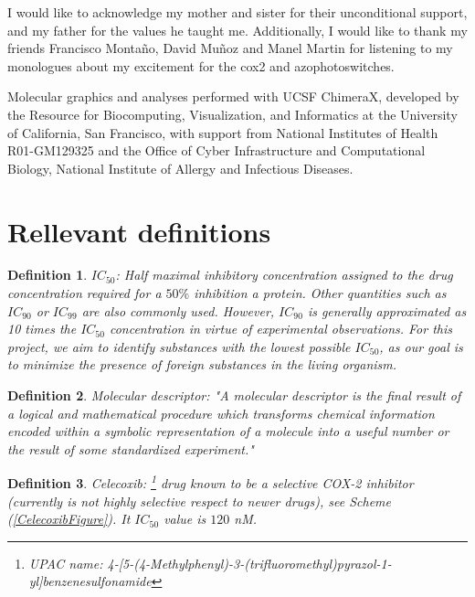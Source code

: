\documentclass[11pt]{article}
\newtheorem{definition}{Definition}
\begin{document}
I would like to acknowledge my mother and sister for their unconditional support, and my father for the values he taught me. Additionally, I would like to thank my friends Francisco Montaño, David Muñoz and Manel Martin for listening to my monologues about my excitement for the \gls{cox2} and azophotoswitches.

Molecular graphics and analyses performed with UCSF ChimeraX, developed by the Resource for Biocomputing, Visualization, and Informatics at the University of California, San Francisco, with support from National Institutes of Health R01-GM129325 and the Office of Cyber Infrastructure and Computational Biology, National Institute of Allergy and Infectious Diseases.

\newpage
\appendix
\section{Rellevant definitions}
\begin{definition}\label{definitionIC50}
$IC_{50}$: Half maximal inhibitory concentration assigned to the drug concentration required for a $50\%$ inhibition a protein. Other quantities such as $IC_{90}$ or $IC_{99}$ are also commonly used. However, $IC_{90}$ is generally approximated as 10 times the $IC_{50}$ concentration in virtue of experimental observations\cite{BookIC50}. For this project, we aim to identify substances with the lowest possible $IC_{50}$, as our goal is to minimize the presence of foreign substances in the living organism.
\end{definition}

\begin{definition}\label{definitionChemicalDescriptors}
Molecular descriptor: "A molecular descriptor is the final result of a logical and mathematical procedure which transforms chemical information encoded within a symbolic representation of a molecule into a useful number or the result of some standardized experiment."\cite{DescriptorsBook}
\end{definition}

\begin{definition}\label{definitionCelecoxib}
Celecoxib: \footnote{UPAC name: 4-[5-(4-Methylphenyl)-3-(trifluoromethyl)pyrazol-1-yl]benzenesulfonamide} drug known to be a selective COX-2 inhibitor (currently is not \emph{highly selective} respect to newer drugs), see Scheme (\ref{CelecoxibFigure}). It $IC_{50}$ value is $120$ nM.
\end{definition}
\end{document}
